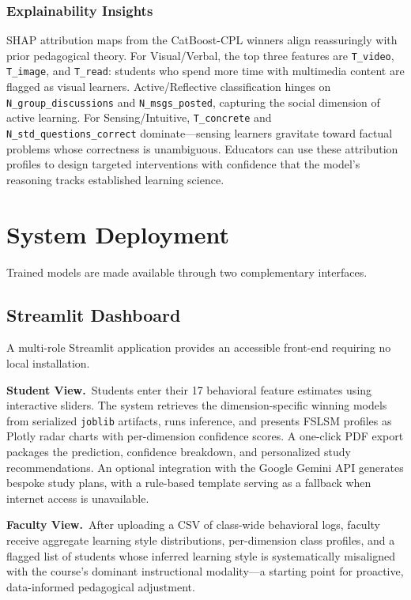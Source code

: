 \documentclass[journal, onecolumn]{IEEEtran}
\begin{document}
\subsubsection{Explainability Insights}
SHAP attribution maps from the CatBoost-CPL winners align reassuringly with prior pedagogical theory. For Visual/Verbal, the top three features are \texttt{T\_video}, \texttt{T\_image}, and \texttt{T\_read}: students who spend more time with multimedia content are flagged as visual learners. Active/Reflective classification hinges on \texttt{N\_group\_discussions} and \texttt{N\_msgs\_posted}, capturing the social dimension of active learning. For Sensing/Intuitive, \texttt{T\_concrete} and \texttt{N\_std\_questions\_correct} dominate---sensing learners gravitate toward factual problems whose correctness is unambiguous. Educators can use these attribution profiles to design targeted interventions with confidence that the model's reasoning tracks established learning science.

\section{System Deployment}

Trained models are made available through two complementary interfaces.

\subsection{Streamlit Dashboard}

A multi-role Streamlit application provides an accessible front-end requiring no local installation.

\textbf{Student View.}\ Students enter their 17 behavioral feature estimates using interactive sliders. The system retrieves the dimension-specific winning models from serialized \texttt{joblib} artifacts, runs inference, and presents FSLSM profiles as Plotly radar charts with per-dimension confidence scores. A one-click PDF export packages the prediction, confidence breakdown, and personalized study recommendations. An optional integration with the Google Gemini API generates bespoke study plans, with a rule-based template serving as a fallback when internet access is unavailable.

\textbf{Faculty View.}\ After uploading a CSV of class-wide behavioral logs, faculty receive aggregate learning style distributions, per-dimension class profiles, and a flagged list of students whose inferred learning style is systematically misaligned with the course's dominant instructional modality---a starting point for proactive, data-informed pedagogical adjustment.
\end{document}
